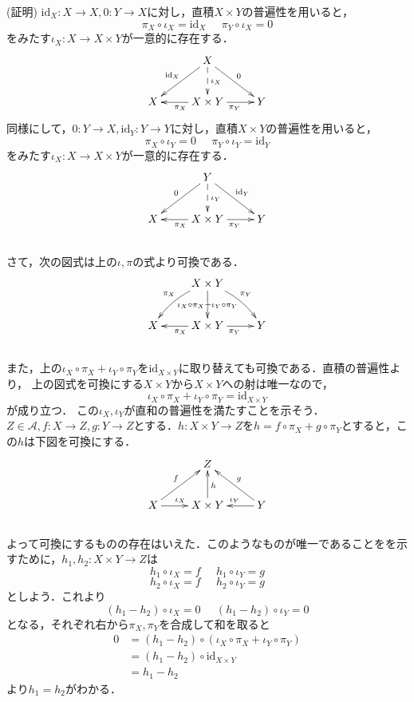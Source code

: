 (証明)
$\mathrm{id}_X : X \to X, 0 :Y \to X$に対し，直積$X \times Y$の普遍性を用いると，
\[
\pi_X \circ \iota_X = \mathrm{id}_X\;\;\;\;\;\pi_Y \circ \iota_X = 0
\]
をみたす$\iota_X : X \to X\times Y$が一意的に存在する．
\[
\xymatrix{
	& \ar[dl]_{\mathrm{id}_X} X  \ar@{-->}[d]^{\iota_X}  \ar[dr]^{0}	& \\
X 	& \ar[l]^{\pi_X} X \times Y \ar[r]_{\pi_Y} 	& Y 
}
\]
同様にして，$0: Y \to X, \mathrm{id}_Y:Y \to Y$に対し，直積$X \times Y$の普遍性を用いると，
\[
\pi_X \circ \iota_Y = 0\;\;\;\;\;\pi_Y \circ \iota_Y = \mathrm{id}_Y
\]
をみたす$\iota_X : X \to X\times Y$が一意的に存在する．
\[
\xymatrix{
	& \ar[dl]_0 Y  \ar@{-->}[d]^{\iota_Y}  \ar[dr]^{\mathrm{id}_Y}	& \\
X 	& \ar[l]^{\pi_X} X \times Y \ar[r]_{\pi_Y} 	& Y 
}
\]
\\
さて，次の図式は上の$\iota,\pi$の式より可換である．
\[
\xymatrix{
	& \ar@/_/[dl]_{\pi_X} X \times Y  \ar[d] | {\iota_X \circ \pi_X + \iota_Y \circ \pi_Y}  \ar@/^/[dr]^{\pi_Y}	& \\
X 	& \ar[l]^{\pi_X} X \times Y \ar[r]_{\pi_Y} 	& Y 
}
\]
\\
また，上の$\iota_X \circ \pi_X + \iota_Y \circ \pi_Y$を$\mathrm{id}_{X \times Y}$に取り替えても可換である．直積の普遍性より，
上の図式を可換にする$X \times Y$から$X \times Y$への射は唯一なので，
\[
\iota_X \circ \pi_X + \iota_Y \circ \pi_Y = \mathrm{id}_{X \times Y}
\]
が成り立つ．
この$\iota_X,\iota_Y$が直和の普遍性を満たすことを示そう．\\
$Z\in \mathcal{A},f:X \to Z, g:Y \to Z$とする．$h : X \times Y \to Z $を$h = f \circ \pi_X + g \circ \pi_Y$とすると，この$h$は下図を可換にする．
\[
\xymatrix{
& \ar@{<-}[dl]_f Z  \ar@{<-}[d]^{h}  \ar@{<-}[dr]^{g}  \\
X \ar[r]^{\iota_X} &  X \times Y & 	\ar[l]_{\iota_Y}  Y 
}
\]
\\
よって可換にするものの存在はいえた．このようなものが唯一であることをを示すために，$h_1,h_2: X \times Y \to Z $は
\[
h_1 \circ \iota_X = f \;\;\;\;\; h_1 \circ \iota_Y = g 
\]\[
h_2 \circ \iota_X = f \;\;\;\;\; h_2 \circ \iota_Y = g
\]
としよう．これより
\[
(h_1-h_2)\circ \iota_X = 0\;\;\;\;\;(h_1-h_2)\circ \iota_Y = 0
\]
となる，それぞれ右から$\pi_X,\pi_Y$を合成して和を取ると
\begin{align*}
0	&= (h_1 - h_2)\circ (\iota_X \circ \pi_X + \iota_Y \circ \pi_Y) \\
	&= (h_1 - h_2)\circ \mathrm{id}_{X \times Y} \\
	&= h_1 - h_2 
\end{align*}
より$h_1 = h_2$がわかる．
\proofend

